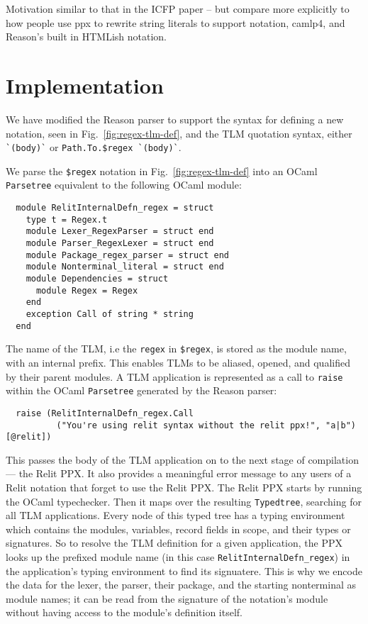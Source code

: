 \documentclass[acmsmall,review]{acmart}
\newcommand{\li}[1]{\lstinline[basicstyle=\ttfamily\fontsize{9pt}{1em}\selectfont]{#1}}
\theoremstyle{slplain}
\numberwithin{thm}{section}
\begin{document}
Motivation similar to that in the ICFP paper -- but compare more explicitly to how people use ppx to rewrite string literals to support notation, camlp4, and Reason's built in HTMLish notation.

\section{Implementation}

We have modified the Reason parser to support the syntax for defining a new notation, seen in Fig.~\ref{fig:regex-tlm-def}, and the TLM quotation syntax, either \li{`(body)`} or \li{Path.To.$regex `(body)`}.

We parse the \li{$regex} notation in Fig.~\ref{fig:regex-tlm-def} into an OCaml \li{Parsetree} equivalent to the following OCaml module:
\begin{lstlisting}
  module RelitInternalDefn_regex = struct
    type t = Regex.t
    module Lexer_RegexParser = struct end
    module Parser_RegexLexer = struct end
    module Package_regex_parser = struct end
    module Nonterminal_literal = struct end
    module Dependencies = struct
      module Regex = Regex
    end
    exception Call of string * string
  end
\end{lstlisting}

The name of the TLM, i.e the \li{regex} in \li{$regex}, is stored as the module name, with an internal prefix. This enables TLMs to be aliased, opened, and qualified by their parent modules. A TLM application is represented as a call to \li{raise} within the OCaml \li{Parsetree} generated by the Reason parser:
\begin{lstlisting}
  raise (RelitInternalDefn_regex.Call
          ("You're using relit syntax without the relit ppx!", "a|b") [@relit])
\end{lstlisting}


This passes the body of the TLM application on to the next stage of compilation --- the Relit PPX. It also provides a meaningful error message to any users of a Relit notation that forget to use the Relit PPX. The Relit PPX starts by running the OCaml typechecker. Then it maps over the resulting \li{Typedtree}, searching for all TLM applications. Every node of this typed tree has a typing environment which contains the modules, variables, record fields in scope, and their types or signatures. So to resolve the TLM definition for a given application, the PPX looks up the prefixed module name (in this case \li{RelitInternalDefn_regex}) in the application's typing environment to find its signuatere. This is why we encode the data for the lexer, the parser, their package, and the starting nonterminal as module names; it can be read from the signature of the notation's module without having access to the module's definition itself.
\end{document}
